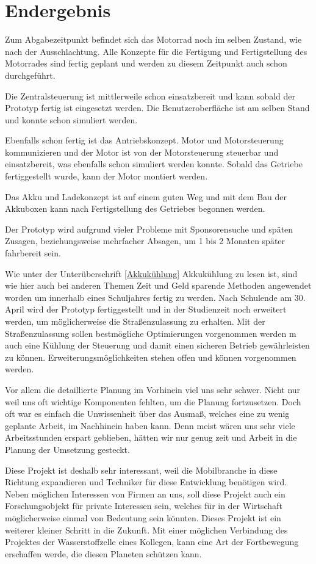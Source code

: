 \chapter{Endergebnis}

Zum Abgabezeitpunkt befindet sich das Motorrad noch im selben Zustand, wie nach der Ausschlachtung. Alle Konzepte für die Fertigung und Fertigstellung des Motorrades sind fertig geplant und werden zu diesem Zeitpunkt auch schon durchgeführt.

Die Zentralsteuerung ist mittlerweile schon einsatzbereit und kann sobald der Prototyp fertig ist eingesetzt werden. Die Benutzeroberfläche ist am selben Stand und konnte schon simuliert werden. 

Ebenfalls schon fertig ist das Antriebskonzept. Motor und Motorsteuerung kommunizieren und der Motor ist von der Motorsteuerung steuerbar und einsatzbereit, was ebenfalls schon simuliert werden konnte. Sobald das Getriebe fertiggestellt wurde, kann der Motor montiert werden. 

Das Akku und Ladekonzept ist auf einem guten Weg und mit dem Bau der Akkuboxen kann nach Fertigstellung des Getriebes begonnen werden.

Der Prototyp wird aufgrund vieler Probleme mit Sponsorensuche und späten Zusagen, beziehungsweise mehrfacher Absagen, um 1 bis 2 Monaten später fahrbereit sein.

Wie unter der Unterüberschrift \ref{Akkukühlung} Akkukühlung zu lesen ist, sind wie hier auch bei anderen Themen Zeit und Geld sparende Methoden angewendet worden um innerhalb eines Schuljahres fertig zu werden. Nach Schulende am 30. April wird der Prototyp fertiggestellt und in der Studienzeit noch erweitert werden, um möglicherweise die Straßenzulassung zu erhalten. Mit der Straßenzulassung sollen bestmögliche Optimierungen vorgenommen werden m auch eine Kühlung der Steuerung und damit einen sicheren Betrieb gewährleisten zu können. Erweiterungsmöglichkeiten stehen offen und können vorgenommen werden. 

Vor allem die detaillierte Planung im Vorhinein viel uns sehr schwer. Nicht nur weil uns oft wichtige Komponenten fehlten, um die Planung fortzusetzen. Doch oft war es einfach die Unwissenheit über das Ausmaß, welches eine zu wenig geplante Arbeit, im Nachhinein haben kann. Denn meist wären uns sehr viele Arbeitsstunden erspart geblieben, hätten wir nur genug zeit und Arbeit in die Planung der Umsetzung gesteckt.

Diese Projekt ist deshalb sehr interessant, weil die Mobilbranche in diese Richtung expandieren und Techniker für diese Entwicklung benötigen wird. Neben möglichen Interessen von Firmen an uns, soll diese Projekt auch ein Forschungsobjekt für private Interessen sein, welches für in der Wirtschaft möglicherweise einmal von Bedeutung sein könnten. Dieses Projekt ist ein weiterer kleiner Schritt in die Zukunft. Mit einer möglichen Verbindung des Projektes der Wasserstoffzelle eines Kollegen, kann eine Art der Fortbewegung erschaffen werde, die diesen Planeten schützen kann. 

